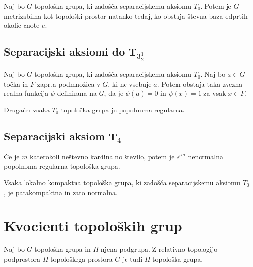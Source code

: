 \documentclass[mat1]{fmfdelo}
\newcommand{\Z}{\mathbb Z}
\begin{document}
\begin{izrek}\label{izr:metrizabilnost}
Naj bo $G$ topološka grupa, ki zadošča separacijskemu aksiomu $T_0$. Potem je $G$ metrizabilna kot topološki prostor natanko tedaj, ko obstaja števna baza odprtih okolic enote $e$.
\end{izrek}

\subsection{Separacijski aksiomi do T$_{3 \frac{1}{2}}$}

\begin{izrek}\label{izr:t3pol}
Naj bo $G$ topološka grupa, ki zadošča separacijskemu aksiomu $T_0$. Naj bo $a \in G$ točka in $F$ zaprta podmnožica v $G$, ki ne vsebuje $a$. Potem obstaja taka zvezna realna funkcija $\psi$ definirana na $G$, da je $\psi (a) = 0$ in $\psi (x) = 1$ za vsak $x \in F$.

Drugače: vsaka $T_0$ topološka grupa je popolnoma regularna.
\end{izrek}

\subsection{Separacijski aksiom T$_4$}
\begin{izrek}\label{izr:t4protiprimer}
Če je $m$ katerokoli neštevno kardinalno število, potem je $\Z^{m}$ nenormalna popolnoma regularna topološka grupa.
\end{izrek}

\begin{izrek}\label{izr:t4}
Vsaka lokalno kompaktna topološka grupa, ki zadošča separacijskemu aksiomu $T_0$, je parakompaktna in zato normalna.
\end{izrek}

\section{Kvocienti topoloških grup}

\begin{trditev}\label{trd:toppodgrupa}
Naj bo $G$ topološka grupa in $H$ njena podgrupa. Z relativno topologijo podprostora $H$ topološkega prostora $G$ je tudi $H$ topološka grupa.
\end{trditev}
\end{document}
